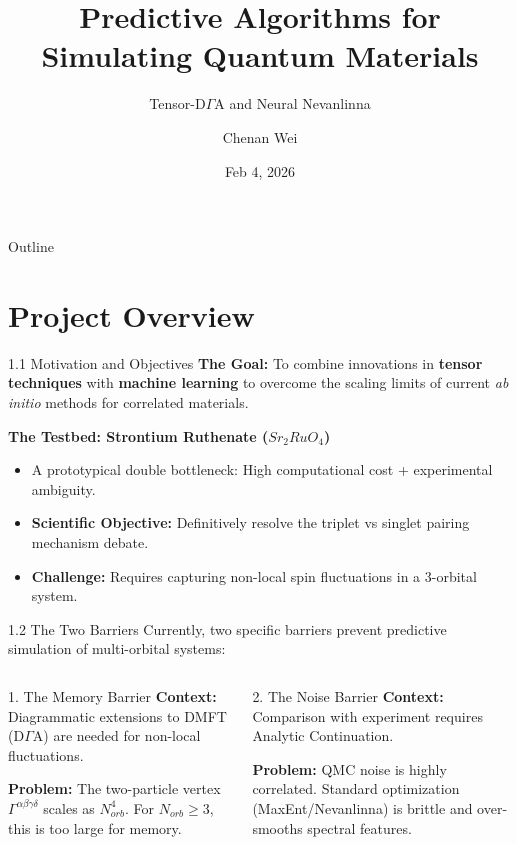 \documentclass[aspectratio=169, 11pt]{beamer}
\title[Predictive Algorithms for Quantum Materials]{Predictive Algorithms for Simulating Quantum Materials}
\subtitle{Tensor-D$\Gamma$A and Neural Nevanlinna}
\author[Chenan Wei]{Chenan Wei}
\date{Feb 4, 2026}
\begin{document}
\begin{frame}
    \titlepage
\end{frame}

\begin{frame}{Outline}
    \tableofcontents
\end{frame}

\section{Project Overview}

\begin{frame}{1.1 Motivation and Objectives}
    \textbf{The Goal:}
    To combine innovations in \textbf{tensor techniques} with \textbf{machine learning} to overcome the scaling limits of current \textit{ab initio} methods for correlated materials.
    
    \textbf{The Testbed: Strontium Ruthenate ($Sr_2RuO_4$)}
    \begin{itemize}
        \item A prototypical double bottleneck: High computational cost + experimental ambiguity.
        \item \textbf{Scientific Objective:} Definitively resolve the triplet vs singlet pairing mechanism debate.
        \item \textbf{Challenge:} Requires capturing non-local spin fluctuations in a 3-orbital system.
    \end{itemize}
\end{frame}

\begin{frame}{1.2 The Two Barriers}
    Currently, two specific barriers prevent predictive simulation of multi-orbital systems:
    
    \begin{columns}
        \begin{alertblock}{1. The Memory Barrier}
            \textbf{Context:} Diagrammatic extensions to DMFT (D$\Gamma$A) are needed for non-local fluctuations.
            \par
            \textbf{Problem:} The two-particle vertex $\Gamma^{\alpha\beta\gamma\delta}$ scales as $N_{orb}^4$. For $N_{orb} \ge 3$, this is too large for memory.
        \end{alertblock}
        
        \begin{alertblock}{2. The Noise Barrier}
            \textbf{Context:} Comparison with experiment requires Analytic Continuation.
            \par
            \textbf{Problem:} QMC noise is highly correlated. Standard optimization (MaxEnt/Nevanlinna) is brittle and over-smooths spectral features.
        \end{alertblock}
    \end{columns}
\end{frame}
\end{document}

